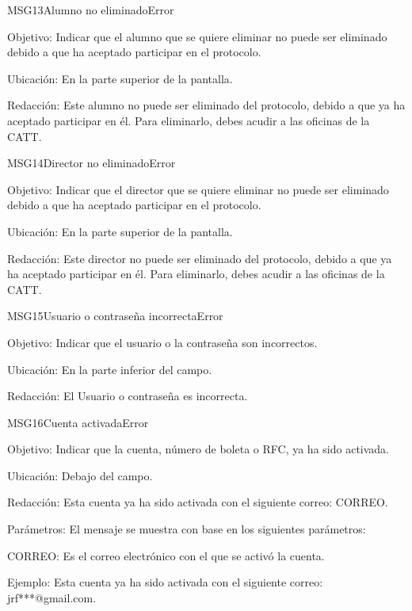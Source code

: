 \begin{mensaje}{MSG13}{Alumno no eliminado}{Error}
	\item[Objetivo:] Indicar que el alumno que se quiere eliminar no puede ser eliminado debido a que ha aceptado participar en el protocolo.
	\item[Ubicación:] En la parte superior de la pantalla.
	\item[Redacción:] Este alumno no puede ser eliminado del protocolo, debido a que ya ha aceptado participar en él. Para eliminarlo, debes acudir a las oficinas de la CATT.
\end{mensaje}

\begin{mensaje}{MSG14}{Director no eliminado}{Error}
	\item[Objetivo:] Indicar que el director que se quiere eliminar no puede ser eliminado debido a que ha aceptado participar en el protocolo.
	\item[Ubicación:] En la parte superior de la pantalla.
	\item[Redacción:] Este director no puede ser eliminado del protocolo, debido a que ya ha aceptado participar en él. Para eliminarlo, debes acudir a las oficinas de la CATT.
\end{mensaje}
\begin{mensaje}{MSG15}{Usuario o contraseña incorrecta}{Error}
	\item[Objetivo:] Indicar que el usuario o la contraseña son incorrectos.
	\item[Ubicación:] En la parte inferior del campo.
	\item[Redacción:] El Usuario o contraseña es incorrecta.
\end{mensaje}

\begin{mensaje}{MSG16}{Cuenta activada}{Error}
	\item[Objetivo:] Indicar que la cuenta, número de boleta o RFC, ya ha sido activada.
	\item[Ubicación:] Debajo del campo.
	\item[Redacción:] Esta cuenta ya ha sido activada con el siguiente correo: CORREO.
	\item[Parámetros:] El mensaje se muestra con base en los siguientes parámetros:
	\begin{Citemize}
		\item CORREO: Es el correo electrónico con el que se activó la cuenta.
	\end{Citemize}
	\item[Ejemplo:] Esta cuenta ya ha sido activada con el siguiente correo: jrf***@gmail.com.
\end{mensaje}

